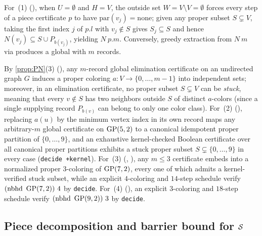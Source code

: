 \begin{outline}
For~(1) (), when $U = \emptyset$ and $H = V$, the outside set $W = V \setminus V
= \emptyset$ forces every step of a piece certificate $p$ to have $\mathrm{par}(v_j) = \mathrm{none}$; given any proper
subset $S \subsetneq V$, taking the first index $j$ of $p.l$ with $v_j \notin S$ gives $S_j \subseteq S$ and hence
$N(v_j) \subseteq S \cup P_{b(v_j)}$, yielding  $N\ p.m$. Conversely, greedy extraction from
 $N\ m$ via  produces a global  with $m$
records.

By \cref{prop:PN}(3) (), any $m$-record global elimination certificate on an undirected graph $G$
induces a proper coloring $a : V \to \{0, \dots, m-1\}$ into independent sets; moreover, in an elimination certificate, no
proper subset $S \subsetneq V$ can be \emph{stuck}, meaning that every $v \notin S$ has two neighbors outside $S$ of
distinct $a$-colors (since a single supplying record $P_{b(v)}$ can belong to only one color class). For~(2)
(), replacing $a(u)$ by the minimum vertex index in its own record maps any arbitrary-$m$ global
certificate on $\operatorname{GP}(5,2)$ to a canonical idempotent proper partition of $\{0, \dots, 9\}$, and an exhaustive kernel-checked
Boolean certificate over all canonical proper partitions exhibits a stuck proper subset $S \subsetneq \{0,\dots,9\}$ in
every case (\texttt{decide +kernel}). For~(3) (, ), any $m \le 3$
certificate embeds into a normalized proper $3$-coloring of $\operatorname{GP}(7,2)$, every one of which admits a kernel-verified stuck
subset, while an explicit $4$-coloring and $14$-step schedule verify  $(\mathrm{nbhd}\ \GP(7,2))\ 4$
by \texttt{decide}. For~(4) (), an explicit $3$-coloring and $18$-step schedule verify
 $(\mathrm{nbhd}\ \GP(9,2))\ 3$ by \texttt{decide}.
\end{outline}

\subsection{Piece decomposition and barrier bound for \texorpdfstring{$\mathcal{S}$}{Class S}}\label{sec:reciprocity-classS}

